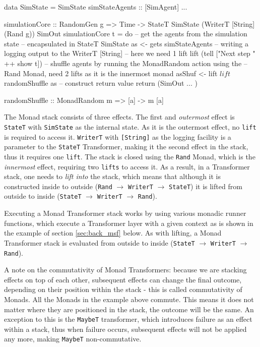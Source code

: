 \begin{HaskellCode}
data SimState = SimState { simStateAgents :: [SimAgent] ... }

simulationCore :: RandomGen g 
               => Time
               -> StateT SimState (WriterT [String] (Rand g)) SimOut
simulationCore t = do
  -- get the agents from the simulation state 
  -- encapsulated in StateT SimState
  as <- gets simStateAgents
  -- writing a logging output to the WriterT [String]
  -- here we need 1 lift 
  lift (tell ["Next step " ++ show t])
  -- shuffle agents by running the MonadRandom action using the
  -- Rand Monad, need 2 lifts as it is the innermost monad
  asShuf <- lift $ lift $ randomShuffle as
  -- construct return value
  return (SimOut { ... })
  
randomShuffle :: MonadRandom m => [a] -> m [a]
\end{HaskellCode}

The Monad stack consists of three effects. The first and \textit{outermost} effect is \texttt{StateT} with \texttt{SimState} as the internal state. As it is the outermost effect, no \texttt{lift} is required to access it. \texttt{WriterT} with \texttt{[String]} as the logging facility is a parameter to the \texttt{StateT} Transformer, making it the second effect in the stack, thus it requires one \texttt{lift}. The stack is closed using the \texttt{Rand} Monad, which is the \textit{innermost} effect, requiring two \texttt{lifts} to access it. As a result, in a Transformer stack, one needs to \textit{lift into} the stack, which means that although it is constructed inside to outside (\texttt{Rand} $\rightarrow$ \texttt{WriterT} $\rightarrow$ \texttt{StateT}) it is lifted from outside to inside (\texttt{StateT} $\rightarrow$ \texttt{WriterT} $\rightarrow$ \texttt{Rand}).

Executing a Monad Transformer stack works by using various monadic runner functions, which execute a Transformer layer with a given context as is shown in the example of section \ref{sec:back_msf} below. As with lifting, a Monad Transformer stack is evaluated from outside to inside (\texttt{StateT} $\rightarrow$ \texttt{WriterT} $\rightarrow$ \texttt{Rand}).

A note on the commutativity of Monad Transformers: because we are stacking effects on top of each other, subsequent effects can change the final outcome, depending on their position within the stack - this is called commutativity of Monads. All the Monads in the example above commute. This means it does not matter where they are positioned in the stack, the outcome will be the same. An exception to this is the \texttt{MaybeT} transformer, which introduces failure as an effect within a stack, thus when failure occurs, subsequent effects will not be applied any more, making \texttt{MaybeT} non-commutative.

